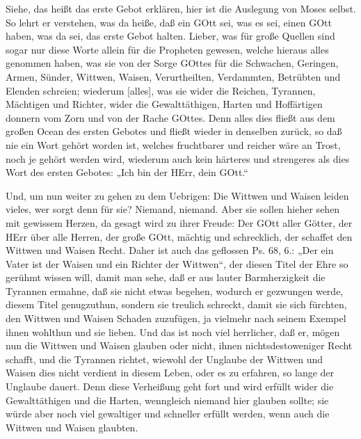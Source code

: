 Siehe, das heißt das erste Gebot erklären, hier ist die Auslegung von Moses selbst. So lehrt er verstehen, was da heiße, daß ein GOtt sei, was es sei, einen GOtt haben, was da sei, das erste Gebot halten. Lieber, was für große Quellen sind sogar nur diese Worte allein für die Propheten gewesen, welche hieraus alles genommen haben, was sie von der Sorge GOttes für die Schwachen, Geringen, Armen, Sünder, Wittwen, Waisen, Verurtheilten, Verdammten, Betrübten und Elenden schreien; wiederum [alles], was sie wider die Reichen, Tyrannen, Mächtigen und Richter, wider die Gewalttäthigen, Harten und Hoffärtigen donnern vom Zorn und von der Rache GOttes. Denn alles dies fließt aus dem großen Ocean des ersten Gebotes und fließt wieder in denselben zurück, so daß nie ein Wort gehört worden ist, welches fruchtbarer und reicher wäre an Trost, noch je gehört werden wird, wiederum auch kein härteres und strengeres als dies Wort des ersten Gebotes: „Ich bin der HErr, dein GOtt.“

Und, um nun weiter zu gehen zu dem Uebrigen: Die Wittwen und Waisen leiden vieles, wer sorgt denn für sie? Niemand, niemand. Aber sie sollen hieher sehen mit gewissem Herzen, da gesagt wird zu ihrer Freude: Der GOtt aller Götter, der HErr über alle Herren, der große GOtt, mächtig und schrecklich, der schaffet den Wittwen und Waisen Recht. Daher ist auch das geflossen Ps. 68, 6.: „Der ein Vater ist der Waisen und ein Richter der Wittwen“, der diesen Titel der Ehre so gerühmt wissen will, damit man sehe, daß er aus lauter Barmherzigkeit die Tyrannen ermahne, daß sie nicht etwas begehen, wodurch er gezwungen werde, diesem Titel genugzuthun, sondern sie treulich schreckt, damit sie sich fürchten, den Wittwen und Waisen Schaden zuzufügen, ja vielmehr nach seinem Exempel ihnen wohlthun und sie lieben. Und das ist noch viel herrlicher, daß er, mögen nun die Wittwen und Waisen glauben oder nicht, ihnen nichtsdestoweniger Recht schafft, und die Tyrannen richtet, wiewohl der Unglaube der Wittwen und Waisen dies nicht verdient in diesem Leben, oder es zu erfahren, so lange der Unglaube dauert. Denn diese Verheißung geht fort und wird erfüllt wider die Gewalttäthigen und die Harten, wenngleich niemand hier glauben sollte; sie würde aber noch viel gewaltiger und schneller erfüllt werden, wenn auch die Wittwen und Waisen glaubten.

